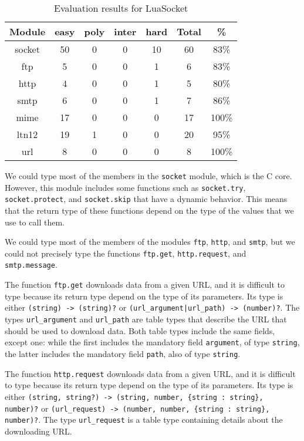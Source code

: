 \begin{table}[!ht]
\begin{center}
\begin{tabular}{|c|c|c|c|c|c|c|}
\hline
\textbf{Module} & \textbf{easy} & \textbf{poly} & \textbf{inter} & \textbf{hard} & \textbf{Total} & \textbf{\%} \\
\hline
socket & 50 & 0 & 0 & 10 & 60 & 83\% \\
\hline
ftp & 5 & 0 & 0 & 1 & 6 & 83\% \\
\hline
http & 4 & 0 & 0 & 1 & 5 & 80\% \\
\hline
smtp & 6 & 0 & 0 & 1 & 7 & 86\% \\
\hline
mime & 17 & 0 & 0 & 0 & 17 & 100\% \\
\hline
ltn12 & 19 & 1 & 0 & 0 & 20 & 95\% \\
\hline
url & 8 & 0 & 0 & 0 & 8 & 100\% \\
\hline
\end{tabular}
\end{center}
\caption{Evaluation results for LuaSocket}
\label{tab:evalsocket}
\end{table}

We could type most of the members in the \texttt{socket} module,
which is the C core.
However, this module includes some functions such as
\texttt{socket.try}, \texttt{socket.protect}, and \texttt{socket.skip}
that have a dynamic behavior.
This means that the return type of these functions depend on the
type of the values that we use to call them.

We could type most of the members of the modules \texttt{ftp},
\texttt{http}, and \texttt{smtp}, but we could not precisely type
the functions \texttt{ftp.get}, \texttt{http.request}, and
\texttt{smtp.message}.

The function \texttt{ftp.get} downloads data from a given URL,
and it is difficult to type because its return type depend on
the type of its parameters.
Its type is either \texttt{(string) -> (string)?} or
\texttt{(url\string_argument|url\string_path) -> (number)?}.
The types \texttt{url\string_argument} and \texttt{url\string_path}
are table types that describe the URL that should be used to
download data.
Both table types include the same fields, except one:
while the first includes the mandatory field \texttt{argument},
of type \texttt{string}, the latter includes the mandatory field
\texttt{path}, also of type \texttt{string}.

The function \texttt{http.request} downloads data from a given URL,
and it is difficult to type because its return type depend on
the type of its parameters.
Its type is either
\texttt{(string, string?) -> (string, number, \{string : string\}, number)?} or
\texttt{(url\string_request) -> (number, number, \{string : string\}, number)?}.
The type \texttt{url\string_request} is a table type containing
details about the downloading URL.

